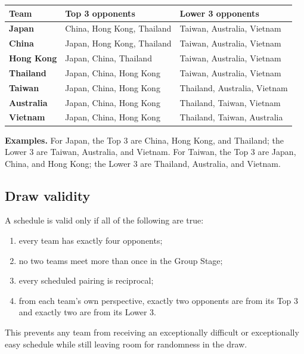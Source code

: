 \documentclass[10pt,a4paper]{article}
\begin{document}
\small
\begin{center}
\begin{tabularx}{\textwidth}{>{\bfseries}p{25mm}X X}
  \toprule
  \textbf{Team} & \textbf{Top 3 opponents} & \textbf{Lower 3 opponents}\\
  \midrule
  Japan & China, Hong Kong, Thailand & Taiwan, Australia, Vietnam\\
  China & Japan, Hong Kong, Thailand & Taiwan, Australia, Vietnam\\
  Hong Kong & Japan, China, Thailand & Taiwan, Australia, Vietnam\\
  Thailand & Japan, China, Hong Kong & Taiwan, Australia, Vietnam\\
  Taiwan & Japan, China, Hong Kong & Thailand, Australia, Vietnam\\
  Australia & Japan, China, Hong Kong & Thailand, Taiwan, Vietnam\\
  Vietnam & Japan, China, Hong Kong & Thailand, Taiwan, Australia\\
  \bottomrule
\end{tabularx}
\end{center}
\normalsize

\begin{notebox}
\textbf{Examples.}
For Japan, the Top 3 are China, Hong Kong, and Thailand; the Lower 3 are
Taiwan, Australia, and Vietnam. For Taiwan, the Top 3 are Japan, China, and
Hong Kong; the Lower 3 are Thailand, Australia, and Vietnam.
\end{notebox}

\subsection{Draw validity}

A schedule is valid only if all of the following are true:

\begin{enumerate}
  \item every team has exactly four opponents;
  \item no two teams meet more than once in the Group Stage;
  \item every scheduled pairing is reciprocal;
  \item from each team's own perspective, exactly two opponents are from its
        Top 3 and exactly two are from its Lower 3.
\end{enumerate}

This prevents any team from receiving an exceptionally difficult or
exceptionally easy schedule while still leaving room for randomness in the
draw.
\end{document}
